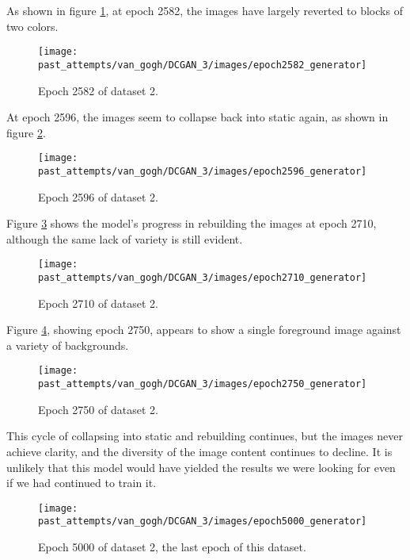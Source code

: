 \documentclass[11pt,letterpaper]{article}
\begin{document}
				As shown in figure \ref{fig:cgvg:epoch2582generator}, at epoch 2582, the images have largely reverted to blocks of two colors.
				\begin{figure}
					\centering
					\texttt{[image: past\_attempts/van\_gogh/DCGAN\_3/images/epoch2582\_generator]}
					\caption{Epoch 2582 of dataset 2.}
					\label{fig:cgvg:epoch2582generator}
				\end{figure}

				At epoch 2596, the images seem to collapse back into static again, as shown in figure \ref{fig:cgvg:epoch2596generator}.
				\begin{figure}
					\centering
					\texttt{[image: past\_attempts/van\_gogh/DCGAN\_3/images/epoch2596\_generator]}
					\caption{Epoch 2596 of dataset 2.}
					\label{fig:cgvg:epoch2596generator}
				\end{figure}

				Figure \ref{fig:cgvg:epoch2710generator} shows the model's progress in rebuilding the images at epoch 2710, although the same lack of variety is still evident.
				\begin{figure}
					\centering
					\texttt{[image: past\_attempts/van\_gogh/DCGAN\_3/images/epoch2710\_generator]}
					\caption{Epoch 2710 of dataset 2.}
					\label{fig:cgvg:epoch2710generator}
				\end{figure}

				Figure \ref{fig:cgvg:epoch2750generator}, showing epoch 2750, appears to show a single foreground image against a variety of backgrounds.
				\begin{figure}
					\centering
					\texttt{[image: past\_attempts/van\_gogh/DCGAN\_3/images/epoch2750\_generator]}
					\caption{Epoch 2750 of dataset 2.}
					\label{fig:cgvg:epoch2750generator}
				\end{figure}

				This cycle of collapsing into static and rebuilding continues, but the images never achieve clarity, and the diversity of the image content continues to decline.
				It is unlikely that this model would have yielded the results we were looking for even if we had continued to train it.
				\begin{figure}
					\centering
					\texttt{[image: past\_attempts/van\_gogh/DCGAN\_3/images/epoch5000\_generator]}
					\caption{Epoch 5000 of dataset 2, the last epoch of this dataset.}
					\label{fig:cgvg:epoch5000generator}
				\end{figure}
\end{document}
